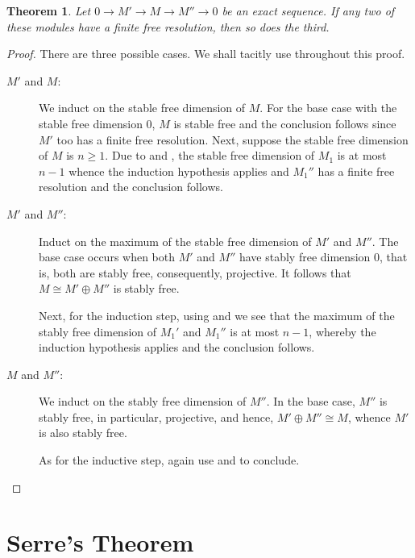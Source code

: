 \documentclass[12pt]{article}
\theoremstyle{thmstyle}
\newtheorem{theorem}{Theorem}[section]
\theoremstyle{defstyle}
\renewcommand{\ge}{\geqslant}
\begin{document}
\begin{theorem}
    Let $0\to M'\to M\to M''\to 0$ be an exact sequence. If any two of these modules have a finite free resolution, then so does the third.
\end{theorem}
\begin{proof}
    There are three possible cases. We shall tacitly use  throughout this proof.
    \begin{description}
        \item[$M'$ and $M$:] We induct on the stable free dimension of $M$. For the base case with the stable free dimension $0$, $M$ is stable free and the conclusion follows since $M'$ too has a finite free resolution. Next, suppose the stable free dimension of $M$ is $n\ge 1$. Due to  and , the stable free dimension of $M_1$ is at most $n - 1$ whence the induction hypothesis applies and $M_1''$ has a finite free resolution and the conclusion follows.

        \item[$M'$ and $M''$:] Induct on the maximum of the stable free dimension of $M'$ and $M''$. The base case occurs when both $M'$ and $M''$ have stably free dimension $0$, that is, both are stably free, consequently, projective. It follows that $M\cong M'\oplus M''$ is stably free. 

        Next, for the induction step, using  and  we see that the maximum of the stably free dimension of $M_1'$ and $M_1''$ is at most $n - 1$, whereby the induction hypothesis applies and the conclusion follows.

        \item[$M$ and $M''$:] We induct on the stably free dimension of $M''$. In the base case, $M''$ is stably free, in particular, projective, and hence, $M'\oplus M''\cong M$, whence $M'$ is also stably free.

        As for the inductive step, again use  and  to conclude. \qedhere
    \end{description}
\end{proof}

\section{Serre's Theorem}
\end{document}
